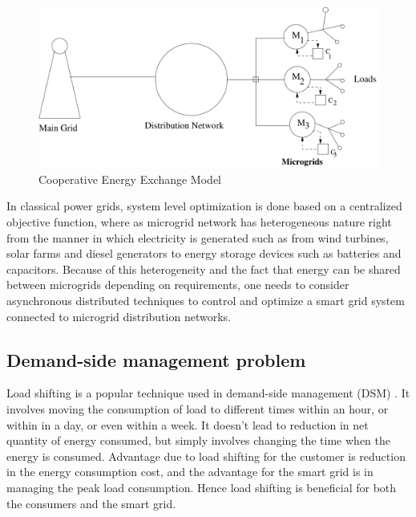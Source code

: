 \begin{figure}[thpb]
      \centering
      \includegraphics[scale=0.4]{powergrid2.pdf}
      \caption{Cooperative Energy Exchange Model}
      \label{gridmodel}
\end{figure}

In classical power grids, system level optimization is done based on a centralized objective function, where as microgrid network has heterogeneous nature right from the manner in which electricity is generated such as from wind turbines, solar farms and diesel generators to energy storage devices such as batteries and capacitors. Because of this heterogeneity and the fact that energy can be shared between microgrids depending on requirements, one needs to consider asynchronous distributed techniques 
to control and optimize a smart grid system connected to microgrid distribution networks.

\subsection{Demand-side management problem}
 Load shifting is a popular technique used in demand-side management (DSM) \cite{DTU2010}. It involves moving the consumption of load to different times within an hour, or within in a day, or even within a week. It doesn't lead to reduction in net quantity of energy consumed, but simply involves changing the time when the energy is consumed. Advantage due to load shifting for the customer is reduction in the energy consumption cost, and the advantage for the smart grid is in managing the peak load consumption. Hence load shifting is beneficial for both the consumers and the smart grid.


